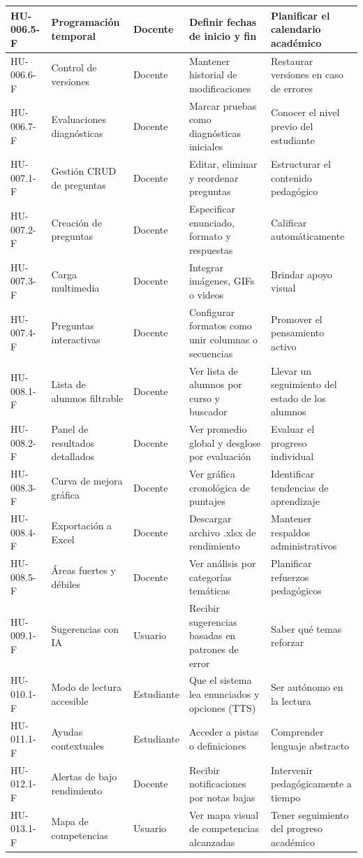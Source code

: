 \begin{table}[H]
\begin{footnotesize}
\begin{tabularx}{\textwidth}{|L{1.7cm}|L{3.5cm}|L{1.5cm}|X|X|}
\hline
HU-006.5-F & Programación temporal & Docente & Definir fechas de inicio y fin & Planificar el calendario académico\\
\hline
HU-006.6-F & Control de versiones & Docente & Mantener historial de modificaciones & Restaurar versiones en caso de errores\\
\hline
HU-006.7-F & Evaluaciones diagnósticas & Docente & Marcar pruebas como diagnósticas iniciales & Conocer el nivel previo del estudiante\\
\hline
HU-007.1-F & Gestión CRUD de preguntas & Docente & Editar, eliminar y reordenar preguntas & Estructurar el contenido pedagógico\\
\hline
HU-007.2-F & Creación de preguntas & Docente & Especificar enunciado, formato y respuestas & Calificar automáticamente\\
\hline
HU-007.3-F & Carga multimedia & Docente & Integrar imágenes, GIFs o videos & Brindar apoyo visual\\
\hline
HU-007.4-F & Preguntas interactivas & Docente & Configurar formatos como unir columnas o secuencias & Promover el pensamiento activo\\
\hline
HU-008.1-F & Lista de alumnos filtrable & Docente & Ver lista de alumnos por curso y buscador & Llevar un seguimiento del estado de los alumnos\\
\hline
HU-008.2-F & Panel de resultados detallados & Docente & Ver promedio global y desglose por evaluación & Evaluar el progreso individual\\
\hline
HU-008.3-F & Curva de mejora gráfica & Docente & Ver gráfica cronológica de puntajes & Identificar tendencias de aprendizaje\\
\hline
HU-008.4-F & Exportación a Excel & Docente & Descargar archivo .xlsx de rendimiento & Mantener respaldos administrativos\\
\hline
HU-008.5-F & Áreas fuertes y débiles & Docente & Ver análisis por categorías temáticas & Planificar refuerzos pedagógicos\\
\hline
HU-009.1-F & Sugerencias con IA & Usuario & Recibir sugerencias basadas en patrones de error & Saber qué temas reforzar\\
\hline
HU-010.1-F & Modo de lectura accesible & Estudiante & Que el sistema lea enunciados y opciones (TTS) & Ser autónomo en la lectura\\
\hline
HU-011.1-F & Ayudas contextuales & Estudiante & Acceder a pistas o definiciones & Comprender lenguaje abstracto\\
\hline
HU-012.1-F & Alertas de bajo rendimiento & Docente & Recibir notificaciones por notas bajas & Intervenir pedagógicamente a tiempo\\
\hline
HU-013.1-F & Mapa de competencias & Usuario & Ver mapa visual de competencias alcanzadas & Tener seguimiento del progreso académico\\
\hline
\end{tabularx}
\end{footnotesize}
\fuenteautor
\end{table}


